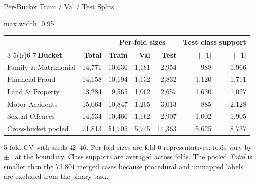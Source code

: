 \documentclass[aspectratio=169,11pt]{beamer}
\begin{document}
\begin{frame}{Per-Bucket Train / Val / Test Splits}
  \scriptsize
  \centering
  \begin{adjustbox}{max width=0.95\textwidth}
    \begin{tabular}{lrrrrrr}
      \toprule
       & & \multicolumn{3}{c}{\textbf{Per-fold sizes}} & \multicolumn{2}{c}{\textbf{Test class support}} \\
      \cmidrule(lr){3-5}\cmidrule(lr){6-7}
      \textbf{Bucket} & \textbf{Total} & \textbf{Train} & \textbf{Val} & \textbf{Test} & $|{-1}|$ & $|{+1}|$ \\
      \midrule
      Family \& Matrimonial & 14{,}771 & 10{,}636 & 1{,}181 & 2{,}954 & 988    & 1{,}966 \\
      Financial Fraud       & 14{,}158 & 10{,}194 & 1{,}132 & 2{,}832 & 1{,}120 & 1{,}711 \\
      Land \& Property      & 13{,}284 &  9{,}565 & 1{,}062 & 2{,}657 & 1{,}630 & 1{,}027 \\
      Motor Accidents       & 15{,}064 & 10{,}847 & 1{,}205 & 3{,}013 & 885    & 2{,}128 \\
      Sexual Offences       & 14{,}534 & 10{,}466 & 1{,}162 & 2{,}907 & 1{,}002 & 1{,}905 \\
      \midrule
      Cross-bucket pooled   & 71{,}813 & 51{,}705 & 5{,}745 & 14{,}363 & 5{,}625 & 8{,}737 \\
      \bottomrule
    \end{tabular}
  \end{adjustbox}

  \vspace{0.4em}
  \scriptsize 5-fold CV with seeds 42--46. Per-fold sizes are fold-0 representatives; folds vary by $\pm 1$ at the boundary. Class supports are averaged across folds. The pooled \emph{Total} is smaller than the 73{,}804 merged cases because procedural and unmapped labels are excluded from the binary task.
\end{frame}
\end{document}
